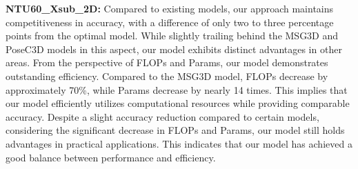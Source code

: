 \documentclass[conference,a4paper,english]{IEEEtran}[2015/08/26]
\begin{document}
\textbf{NTU60\_Xsub\_2D: }Compared to existing models, our approach maintains competitiveness in accuracy,
 with a difference of only two to three percentage points from the optimal model. While slightly 
 trailing behind the MSG3D and PoseC3D models in this aspect, our model exhibits distinct advantages 
 in other areas. From the perspective of FLOPs and Params, our model demonstrates outstanding efficiency.
  Compared to the MSG3D model, FLOPs decrease by approximately 70\%, while Params decrease by nearly 14 
  times. This implies that our model efficiently utilizes computational resources while providing comparable 
  accuracy. Despite a slight accuracy reduction compared to certain models, considering the significant 
  decrease in FLOPs and Params, our model still holds advantages in practical applications. 
  This indicates that our model has achieved a good balance between performance and efficiency.

  \begin{table}[h]
    \centering
    \caption{Comparison with state-of-the-art methods on NTU60\_Xsub\_2D dataset.}
    \label{tab:model_comparison}
    \end{table}
    
\end{document}
